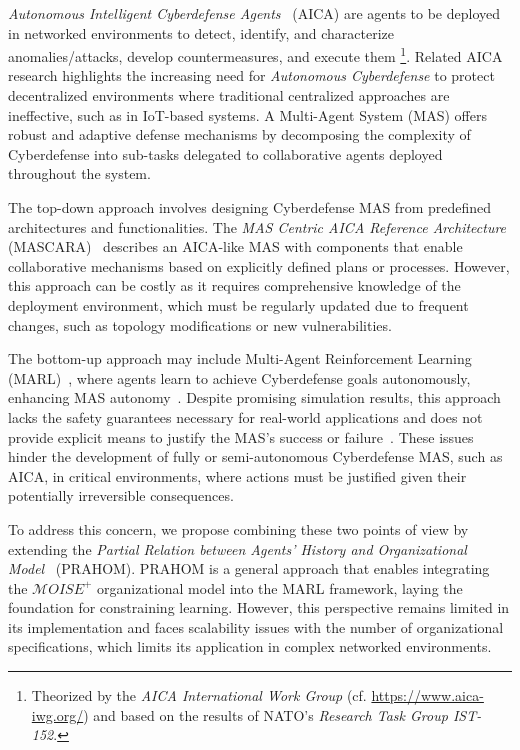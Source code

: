 \documentclass[conference]{IEEEtran}
\begin{document}
\textit{Autonomous Intelligent Cyberdefense Agents}~\cite{Kott2023} (AICA) are agents to be deployed in networked environments to detect, identify, and characterize anomalies/attacks, develop countermeasures, and execute them
%
\footnote{
    Theorized by the \textit{AICA International Work Group} (cf. \url{https://www.aica-iwg.org/}) and based on the results of NATO's \textit{Research Task Group IST-152}.
}.
Related AICA research highlights the increasing need for \textit{Autonomous Cyberdefense} to protect decentralized environments where traditional centralized approaches are ineffective, such as in IoT-based systems. A Multi-Agent System (MAS) offers robust and adaptive defense mechanisms by decomposing the complexity of Cyberdefense into sub-tasks delegated to collaborative agents deployed throughout the system.

The top-down approach involves designing Cyberdefense MAS from predefined architectures and functionalities. The \textit{MAS Centric AICA Reference Architecture} (MASCARA)~\cite{Kott2023} describes an AICA-like MAS with components that enable collaborative mechanisms based on explicitly defined plans or processes. However, this approach can be costly as it requires comprehensive knowledge of the deployment environment, which must be regularly updated due to frequent changes, such as topology modifications or new vulnerabilities.

The bottom-up approach may include Multi-Agent Reinforcement Learning (MARL)~\cite{Albrecht2024}, where agents learn to achieve Cyberdefense goals autonomously, enhancing MAS autonomy~\cite{hammar_stadle4_noms_23}. Despite promising simulation results, this approach lacks the safety guarantees necessary for real-world applications and does not provide explicit means to justify the MAS's success or failure~\cite{dulacarnold2019}. These issues hinder the development of fully or semi-autonomous Cyberdefense MAS, such as AICA, in critical environments, where actions must be justified given their potentially irreversible consequences.

To address this concern, we propose combining these two points of view by extending the \textit{Partial Relation between Agents' History and Organizational Model}~\cite{soule2024} (PRAHOM). PRAHOM is a general approach that enables integrating the $\mathcal{M}OISE^+$ organizational model into the MARL framework, laying the foundation for constraining learning. However, this perspective remains limited in its implementation and faces scalability issues with the number of organizational specifications, which limits its application in complex networked environments.
\end{document}
